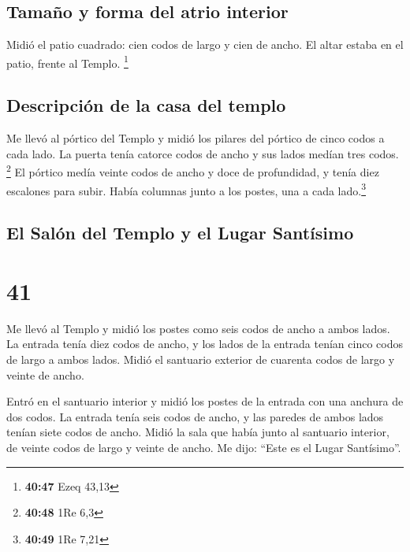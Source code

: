 \hypertarget{tamauxf1o-y-forma-del-atrio-interior}{%
\subsection{Tamaño y forma del atrio
interior}\label{tamauxf1o-y-forma-del-atrio-interior}}

 Midió el patio cuadrado: cien codos de largo y cien de
ancho. El altar estaba en el patio, frente al Templo. \footnote{\textbf{40:47}
  Ezeq 43,13}

\hypertarget{descripciuxf3n-de-la-casa-del-templo}{%
\subsection{Descripción de la casa del
templo}\label{descripciuxf3n-de-la-casa-del-templo}}

 Me llevó al pórtico del Templo y midió los pilares del
pórtico de cinco codos a cada lado. La puerta tenía catorce codos de
ancho y sus lados medían tres codos. \footnote{\textbf{40:48} 1Re 6,3}
 El pórtico medía veinte codos de ancho y doce de
profundidad, y tenía diez escalones para subir. Había columnas junto a
los postes, una a cada lado.\footnote{\textbf{40:49} 1Re 7,21}

\hypertarget{el-saluxf3n-del-templo-y-el-lugar-santuxedsimo}{%
\subsection{El Salón del Templo y el Lugar
Santísimo}\label{el-saluxf3n-del-templo-y-el-lugar-santuxedsimo}}

\hypertarget{section-40}{%
\section{41}\label{section-40}}

 Me llevó al Templo y midió los postes como seis codos de
ancho a ambos lados.  La entrada tenía diez codos de
ancho, y los lados de la entrada tenían cinco codos de largo a ambos
lados. Midió el santuario exterior de cuarenta codos de largo y veinte
de ancho.

 Entró en el santuario interior y midió los postes de la
entrada con una anchura de dos codos. La entrada tenía seis codos de
ancho, y las paredes de ambos lados tenían siete codos de ancho.
 Midió la sala que había junto al santuario interior, de
veinte codos de largo y veinte de ancho. Me dijo: ``Este es el Lugar
Santísimo''.

